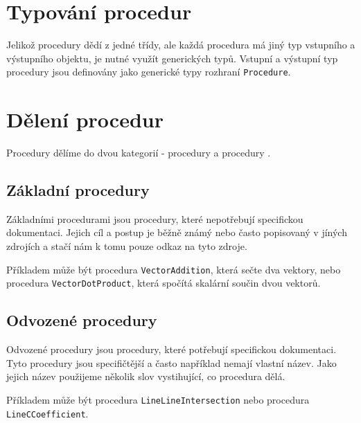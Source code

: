 \section[Typování]{Typování procedur}
\label{sec:procedure-typing}

Jelikož procedury dědí z jedné třídy, ale každá procedura má jiný typ vstupního a výstupního objektu, je nutné využít generických typů.
Vstupní a výstupní typ procedury jsou definovány jako generické typy rozhraní \texttt{Procedure}\cite[line 6]{geometryjs:source:interfaces:procedure.ts}.

\section[Dělení]{Dělení procedur}
\label{subsec:procedure-categorization}

Procedury dělíme do dvou kategorií - procedury  a procedury .

\subsection[Základní]{Základní procedury}
\label{subsubsec:basic-procedures}

Základními procedurami jsou procedury, které nepotřebují specifickou dokumentaci.
Jejich cíl a postup je běžně známý nebo často popisovaný v jíných zdrojích a stačí nám k tomu pouze odkaz na tyto zdroje.

Příkladem může být procedura \texttt{VectorAddition}\cite[line 9-23]{geometryjs:source:procedures:vectorOperations.ts}, která sečte dva vektory, nebo procedura \texttt{VectorDotProduct}\cite[line 88-99]{geometryjs:source:procedures:vectorOperations.ts}, která spočítá skalární součin dvou vektorů.

\subsection[Odvozené]{Odvozené procedury}
\label{subsubsec:derived-procedures}

Odvozené procedury jsou procedury, které potřebují specifickou dokumentaci.
Tyto procedury jsou specifičtější a často například nemají vlastní název.
Jako jejich název použijeme několik slov vystihující, co procedura dělá.

Příkladem může být procedura \texttt{LineLineIntersection}\cite[line 11-27]{geometryjs:source:procedures:lineLine.ts} nebo procedura \texttt{LineCCoefficient}\cite[line 11-20]{geometryjs:source:procedures:lineEquation.ts}.
